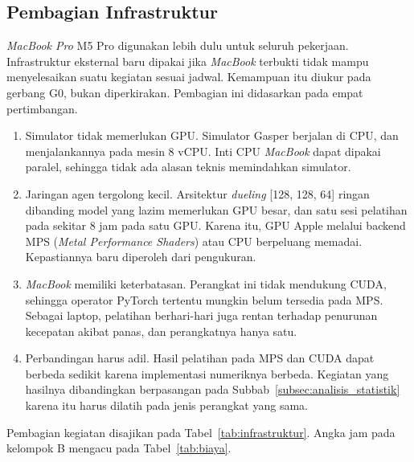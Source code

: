 \subsection{Pembagian Infrastruktur}
\label{subsec:infrastruktur}
\textit{MacBook Pro} M5 Pro digunakan lebih dulu untuk seluruh pekerjaan. Infrastruktur eksternal baru dipakai jika \textit{MacBook} terbukti tidak mampu menyelesaikan suatu kegiatan sesuai jadwal. Kemampuan itu diukur pada gerbang G0, bukan diperkirakan. Pembagian ini didasarkan pada empat pertimbangan.
\begin{enumerate}
	\item Simulator tidak memerlukan GPU. Simulator Gasper berjalan di CPU, dan \textcite{laneve2025stochastic} menjalankannya pada mesin 8 vCPU. Inti CPU \textit{MacBook} dapat dipakai paralel, sehingga tidak ada alasan teknis memindahkan simulator.
	\item Jaringan agen tergolong kecil. Arsitektur \textit{dueling} [128, 128, 64] ringan dibanding model yang lazim memerlukan GPU besar, dan satu sesi pelatihan pada \textcite{skowronski2026adaptive} sekitar 8 jam pada satu GPU. Karena itu, GPU Apple melalui backend MPS (\textit{Metal Performance Shaders}) atau CPU berpeluang memadai. Kepastiannya baru diperoleh dari pengukuran.
	\item \textit{MacBook} memiliki keterbatasan. Perangkat ini tidak mendukung CUDA, sehingga operator PyTorch tertentu mungkin belum tersedia pada MPS. Sebagai laptop, pelatihan berhari-hari juga rentan terhadap penurunan kecepatan akibat panas, dan perangkatnya hanya satu.
	\item Perbandingan harus adil. Hasil pelatihan pada MPS dan CUDA dapat berbeda sedikit karena implementasi numeriknya berbeda. Kegiatan yang hasilnya dibandingkan berpasangan pada Subbab~\ref{subsec:analisis_statistik} karena itu harus dilatih pada jenis perangkat yang sama.
\end{enumerate}

Pembagian kegiatan disajikan pada Tabel~\ref{tab:infrastruktur}. Angka jam pada kelompok B mengacu pada Tabel~\ref{tab:biaya}.

